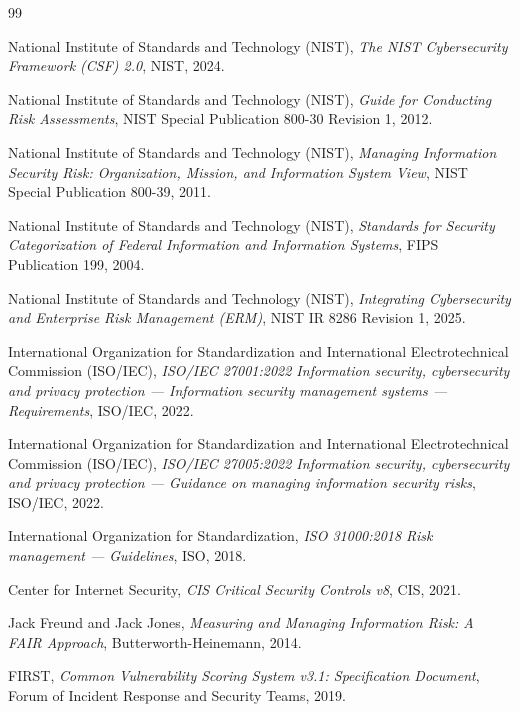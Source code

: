 \documentclass[11pt]{article}
\begin{document}
\begin{thebibliography}{99}

  National Institute of Standards and Technology (NIST),
  \emph{The NIST Cybersecurity Framework (CSF) 2.0},
  NIST, 2024.

  National Institute of Standards and Technology (NIST),
  \emph{Guide for Conducting Risk Assessments},
  NIST Special Publication 800-30 Revision 1, 2012.

  National Institute of Standards and Technology (NIST),
  \emph{Managing Information Security Risk: Organization, Mission, and Information System View},
  NIST Special Publication 800-39, 2011.

  National Institute of Standards and Technology (NIST),
  \emph{Standards for Security Categorization of Federal Information and Information Systems},
  FIPS Publication 199, 2004.

  National Institute of Standards and Technology (NIST),
  \emph{Integrating Cybersecurity and Enterprise Risk Management (ERM)},
  NIST IR 8286 Revision 1, 2025.

  International Organization for Standardization and International Electrotechnical Commission (ISO/IEC),
  \emph{ISO/IEC 27001:2022 Information security, cybersecurity and privacy protection --- Information security management systems --- Requirements},
  ISO/IEC, 2022.

  International Organization for Standardization and International Electrotechnical Commission (ISO/IEC),
  \emph{ISO/IEC 27005:2022 Information security, cybersecurity and privacy protection --- Guidance on managing information security risks},
  ISO/IEC, 2022.

  International Organization for Standardization,
  \emph{ISO 31000:2018 Risk management --- Guidelines},
  ISO, 2018.

  Center for Internet Security,
  \emph{CIS Critical Security Controls v8},
  CIS, 2021.

  Jack Freund and Jack Jones,
  \emph{Measuring and Managing Information Risk: A FAIR Approach},
  Butterworth-Heinemann, 2014.

  FIRST,
  \emph{Common Vulnerability Scoring System v3.1: Specification Document},
  Forum of Incident Response and Security Teams, 2019.


\end{thebibliography}
\end{document}
